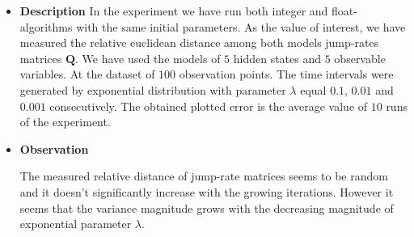 \documentclass[thesis=M,english]{FITthesis}[2012/10/20]
\newcommand{\matr}[1]{\mathbf{#1}}
\begin{document}
\begin{itemize}
\item \textbf{ Description }
In the experiment we have run both integer and float-algorithms with the same initial parameters. As the value of interest, we have measured the relative euclidean distance among both models jump-rates matrices $\matr{Q}$. We have used the models of $5$ hidden states and $5$ observable variables. At the dataset of $100$ observation points. The time intervals were generated by exponential distribution with parameter $\lambda$ equal $0.1$, $0.01$ and $0.001$ consecutively. The obtained plotted error is the average value of $10$ runs of the experiment.      

\item \textbf{ Observation }

The measured relative distance of jump-rate matrices seems to be random and it doesn't significantly increase with the growing iterations. However it seems that the variance magnitude grows with the decreasing magnitude of exponential parameter $\lambda$.   



\end{itemize}
\end{document}
